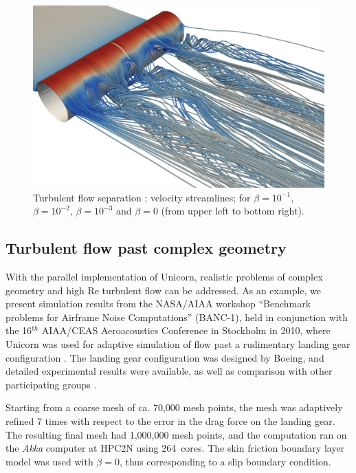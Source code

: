 \begin{figure}
  \includegraphics[width=\twofigs]{chapters/hoffman-1/png/Hoffman_fig5d.png}
  \caption{Turbulent flow separation \citep{HoffmanJansson2009}: velocity
    streamlines; for $\beta = 10^{-1}$, $\beta = 10^{-2}$, $\beta = 10^{-3}$
    and $\beta = 0$ (from upper left to bottom right).}
  \label{hoffman-1:fig:3}
\end{figure}

\subsection{Turbulent flow past complex geometry}

With the parallel implementation of Unicorn, realistic problems of
complex geometry and high Re turbulent flow can be addressed. As an
example, we present simulation results from the NASA/AIAA workshop
``Benchmark problems for Airframe Noise Computations'' (BANC-1), held
in conjunction with the 16$^{th}$ AIAA/CEAS Aeroacoustics Conference
in Stockholm in 2010, where Unicorn was used for adaptive simulation
of flow past a rudimentary landing gear configuration
\citep{VilelaJanssonEtAl2010}. The landing gear configuration was
designed by Boeing, and detailed experimental results were available,
as well as comparison with other participating groups
\citep{SpalartMejia2011}.

Starting from a coarse mesh of ca. 70,000 mesh points, the mesh was
adaptively refined 7 times with respect to the error in the drag force
on the landing gear. The resulting final mesh had 1,000,000 mesh
points, and the computation ran on the \textit{Akka} computer at HPC2N
using 264~cores. The skin friction boundary layer model was used with
$\beta=0$, thus corresponding to a slip boundary condition.

